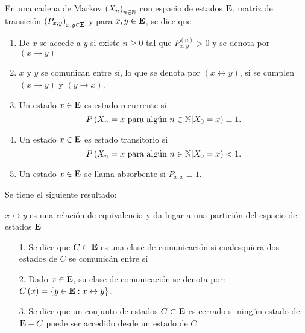 \begin{Def}
En una cadena de Markov $\left(X_{n}\right)_{n\in\mathbb{N}}$ con espacio de estados $\mathbf{E}$, matriz de transición $\left(P_{x,y}\right)_{x,y\in\mathbf{E}}$ y para $x,y\in\mathbf{E}$,  se dice que
\begin{enumerate}
\item  De $x$ se accede a $y$ si existe $n\geq0$ tal que $P_{x,y}^{(n)}>0$ y se denota por $\left(x\rightarrow y\right)$

\item $x$ y $y$ se comunican entre sí, lo que se denota por $\left(x\leftrightarrow y\right)$, si se cumplen $\left(x\rightarrow y\right)$ y $\left(y\rightarrow x\right)$.

\item Un estado $x\in\mathbf{E}$ es estado recurrente si $$P\left(X_{n}=x\textrm{ para algún }n\in\mathbb{N}|X_{0}=x \right)\equiv1.$$ 

\item Un estado $x\in\mathbf{E}$ es estado transitorio si $$P\left(X_{n}=x\textrm{ para algún }n\in\mathbb{N}|X_{0}=x \right)<1.$$ 

\item Un estado $x\in\mathbf{E}$ se llama absorbente si $P_{x,x}\equiv1$.
\end{enumerate}
\end{Def}


Se tiene el siguiente resultado:

\begin{Prop}
$x\leftrightarrow y$ es una relación de equivalencia y da lugar a una partición del espacio de estados $\mathbf{E}$
\end{Prop}


\begin{Def}
\begin{enumerate}
\item[1.  ] Se dice que $C\subset \mathbf{E}$ es una clase de comunicación si cualesquiera dos estados de $C$ se comunicán entre sí

\item[2.  ] Dado $x\in\mathbf{E}$, su clase de comunicación se denota por: $C\left(x\right)=\left\{y\in\mathbf{E}:x\leftrightarrow y\right\}$.

\item[3.  ] Se dice que un conjunto de estados  $C\subset \mathbf{E}$ es cerrado si ningún estado de $\mathbf{E}-C$ puede ser accedido desde un estado de $C$.
\end{enumerate}
\end{Def}


